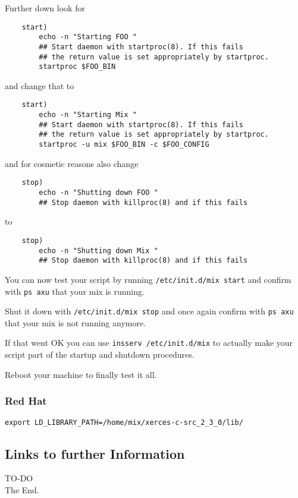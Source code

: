 \documentclass{article}
\begin{document}
Further down look for 

\begin{verbatim}
    start)
        echo -n "Starting FOO "
        ## Start daemon with startproc(8). If this fails
        ## the return value is set appropriately by startproc.
        startproc $FOO_BIN

\end{verbatim}

and change that to

\begin{verbatim}
    start)
        echo -n "Starting Mix "
        ## Start daemon with startproc(8). If this fails
        ## the return value is set appropriately by startproc.
        startproc -u mix $FOO_BIN -c $FOO_CONFIG

\end{verbatim}

and for cosmetic reasons also change

\begin{verbatim}
    stop)
        echo -n "Shutting down FOO "
        ## Stop daemon with killproc(8) and if this fails
\end{verbatim}

to

\begin{verbatim}
    stop)
        echo -n "Shutting down Mix "
        ## Stop daemon with killproc(8) and if this fails
\end{verbatim}

You can now test your script by running \texttt{/etc/init.d/mix start} and
confirm with \texttt{ps axu} that your mix is running.

Shut it down with \texttt{/etc/init.d/mix stop} and once again
confirm with \texttt{ps axu} that your mix is not running anymore.

If that went OK you can use \texttt{insserv /etc/init.d/mix} to 
actually make your script part of the startup and shutdown procedures.

Reboot your machine to finally test it all.


\subsubsection{Red Hat}


\verb|export LD_LIBRARY_PATH=/home/mix/xerces-c-src_2_3_0/lib/|



\subsection{Links to further Information}


TO-DO\\

The End.
\end{document}
